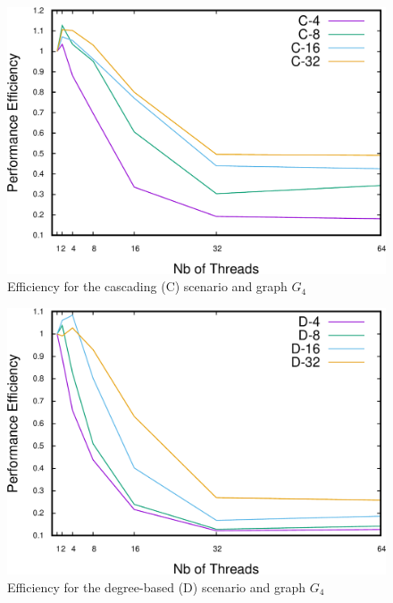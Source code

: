 \begin{figure}
\centering
\includegraphics[scale=0.35]{bench/bench-efficiency/efficiency-c-4-crop.pdf}
\caption{Efficiency for the cascading (C) scenario and graph $G_4$}
\label{fig:effc4}
\end{figure}

\begin{figure}
\centering
\includegraphics[scale=0.35]{bench/bench-efficiency/efficiency-d-4-crop.pdf}
\caption{Efficiency for the degree-based (D) scenario and graph $G_4$}
\label{fig:effd4}
\end{figure}


